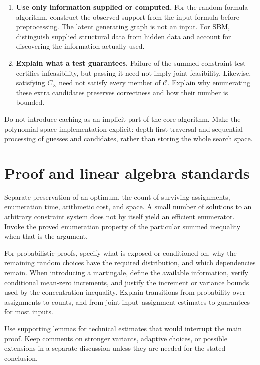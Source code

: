 \documentclass[11pt,a4paper]{article}
\begin{document}
\begin{enumerate}
\item \textbf{Use only information supplied or computed.}
For the random-formula algorithm, construct the observed support from
the input formula before preprocessing. The latent generating graph is
not an input. For SBM, distinguish supplied structural data from hidden
data and account for discovering the information actually used.

\item \textbf{Explain what a test guarantees.}
Failure of the summed-constraint test certifies infeasibility, but passing
it need not imply joint feasibility. Likewise, satisfying $C_\Sigma$
need not satisfy every member of $\mathcal C$. Explain why enumerating
these extra candidates preserves correctness and how their number is
bounded.
\end{enumerate}

Do not introduce caching as an implicit part of the core algorithm.
Make the polynomial-space implementation explicit: depth-first traversal
and sequential processing of guesses and candidates, rather than storing
the whole search space.

\section{Proof and linear algebra standards}

Separate preservation of an optimum, the count of surviving assignments,
enumeration time, arithmetic cost, and space. A small number of solutions
to an arbitrary constraint system does not by itself yield an efficient
enumerator. Invoke the proved enumeration property of the particular
summed inequality when that is the argument.

For probabilistic proofs, specify what is exposed or conditioned on,
why the remaining random choices have the required distribution, and
which dependencies remain. When introducing a martingale, define the
available information, verify conditional mean-zero increments, and
justify the increment or variance bounds used by the concentration
inequality. Explain transitions from probability over assignments to
counts, and from joint input--assignment estimates to guarantees for
most inputs.

Use supporting lemmas for technical estimates that would interrupt the
main proof. Keep comments on stronger variants, adaptive choices, or
possible extensions in a separate discussion unless they are needed
for the stated conclusion.
\end{document}
